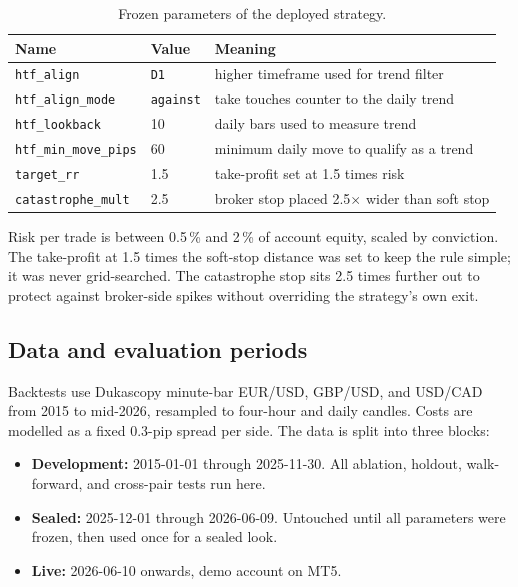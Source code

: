 \documentclass[11pt,a4paper]{article}
\begin{document}
\begin{table}[h]
\centering
\caption{Frozen parameters of the deployed strategy.}
\label{tab:params}
\begin{tabular}{lll}
\toprule
Name & Value & Meaning \\
\midrule
\texttt{htf\_align}        & \texttt{D1}        & higher timeframe used for trend filter \\
\texttt{htf\_align\_mode}  & \texttt{against}   & take touches counter to the daily trend \\
\texttt{htf\_lookback}     & 10                 & daily bars used to measure trend \\
\texttt{htf\_min\_move\_pips} & 60               & minimum daily move to qualify as a trend \\
\texttt{target\_rr}        & 1.5                & take-profit set at 1.5 times risk \\
\texttt{catastrophe\_mult} & 2.5                & broker stop placed 2.5\(\times\) wider than soft stop \\
\bottomrule
\end{tabular}
\end{table}

Risk per trade is between 0.5\,\% and 2\,\% of account equity, scaled by
conviction. The take-profit at 1.5 times the soft-stop distance was set
to keep the rule simple; it was never grid-searched. The catastrophe
stop sits 2.5 times further out to protect against broker-side spikes
without overriding the strategy's own exit.

\subsection{Data and evaluation periods}

Backtests use Dukascopy minute-bar EUR/USD, GBP/USD, and USD/CAD from
2015 to mid-2026, resampled to four-hour and daily candles. Costs are
modelled as a fixed 0.3-pip spread per side. The data is split into
three blocks:

\begin{itemize}
  \item \textbf{Development:} 2015-01-01 through 2025-11-30. All
        ablation, holdout, walk-forward, and cross-pair tests run here.
  \item \textbf{Sealed:} 2025-12-01 through 2026-06-09. Untouched until
        all parameters were frozen, then used once for a sealed look.
  \item \textbf{Live:} 2026-06-10 onwards, demo account on MT5.
\end{itemize}
\end{document}
